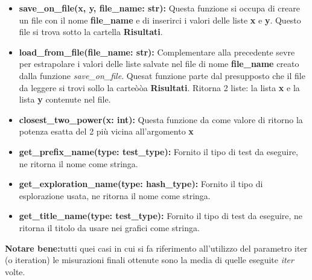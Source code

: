 \documentclass{article}
\newcommand{\newlineitem}[1]{\item \textbf{#1} \hfill \break}
\begin{document}
\begin{itemize}
\newlineitem{save\_on\_file(x, y, file\_name: str):}
Questa funzione si occupa di creare un file con il nome \textbf{file\_name} e di inserirci i valori delle liste \textbf{x} e \textbf{y}. Questo file si trova sotto la cartella \textbf{Risultati}.
\newlineitem{load\_from\_file(file\_name: str):}
Complementare alla precedente sevre per estrapolare i valori delle liste salvate nel file di nome \textbf{file\_name} creato dalla funzione \emph{save\_on\_file}. Quesat funzione parte dal presupposto che il file da leggere si trovi sollo la carteòòa \textbf{Risultati}. Ritorna 2 liste: la lista \textbf{x} e la lista \textbf{y} contenute nel file.
\newlineitem{closest\_two\_power(x: int):}
Questa funzione da come valore di ritorno la potenza esatta del 2 più vicina all'argomento \textbf{x}
\newlineitem{get\_prefix\_name(type: test\_type):}
Fornito il tipo di test da eseguire, ne ritorna il nome come stringa.
\newlineitem{get\_exploration\_name(type: hash\_type):}
Fornito il tipo di esplorazione usata, ne ritorna il nome come stringa.
\newlineitem{get\_title\_name(type: test\_type):}
Fornito il tipo di test da eseguire, ne ritorna il titolo da usare nei grafici come stringa.
\end{itemize}
\textbf{Notare bene:}tutti quei casi in cui si fa riferimento all'utilizzo del parametro iter (o iteration) le misurazioni finali ottenute sono la media di quelle eseguite \emph{iter} volte.
\end{document}
